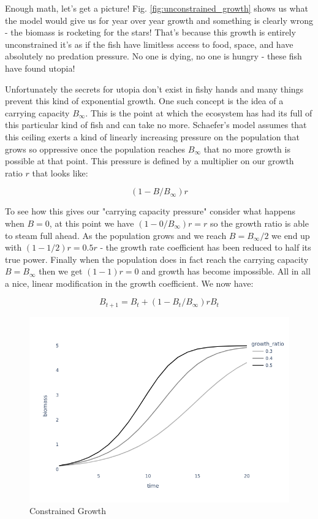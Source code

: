 \documentclass[11pt,a5paper]{book}
\begin{document}
Enough math, let's get a picture! Fig. \ref{fig:unconstrained_growth} shows us what the model would give us for year over year growth and something is clearly wrong - the biomass is rocketing for the stars! That's because this growth is entirely unconstrained it's as if the fish have limitless access to food, space, and have absolutely no predation pressure. No one is dying, no one is hungry - these fish have found utopia!
\newline



Unfortunately the secrets for utopia don't exist in fishy hands and many things prevent this kind of exponential growth. One such concept is the idea of a carrying capacity $B_{\infty}$. This is the point at which the ecosystem has had its full of this particular kind of fish and can take no more. Schaefer's model assumes that this ceiling exerts a kind of linearly increasing pressure on the population that grows so oppressive once the population reaches $B_\infty$ that no more growth is possible at that point. This pressure is defined by a multiplier on our growth ratio $r$ that looks like:

$$(1-B/B_\infty)r$$

To see how this gives our "carrying capacity pressure" consider what happens when $B=0$, at this point we have $(1-0/B_\infty)r=r$ so the growth ratio is able to steam full ahead. As the population grows and we reach $B=B_\infty / 2$ we end up with $(1-1/2)r =0.5r$ - the growth rate coefficient has been reduced to half its true power. Finally when the population does in fact reach the carrying capacity $B=B_\infty$ then we get $(1-1)r=0$ and growth has become impossible. All in all a nice, linear modification in the growth coefficient. We now have:

$$B_{t+1} = B_{t} + (1 - B_t/B_\infty)rB_t$$

\begin{figure}[h!] 
  \includegraphics[width=\linewidth]{notebooks/SurplusModels/capped_growth.png}
  \caption{Constrained Growth}
  \label{fig:constrained_growth}
\end{figure}
\end{document}
